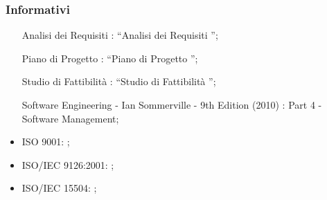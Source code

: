 		\subsubsection{Informativi}
			\begin{itemize}
				\item[Analisi dei Requisiti]: “Analisi dei Requisiti \lastversion”;
				\item[Piano di Progetto]: “Piano di Progetto \lastversion”;
				\item[Studio di Fattibilità]: “Studio di Fattibilità \lastversion”;
				\item[Software Engineering - Ian Sommerville - 9th Edition (2010)]: Part 4 - Software Management;
				\item ISO 9001: ;
				\item ISO/IEC 9126:2001: ;
				\item ISO/IEC 15504: ;
			\end{itemize}